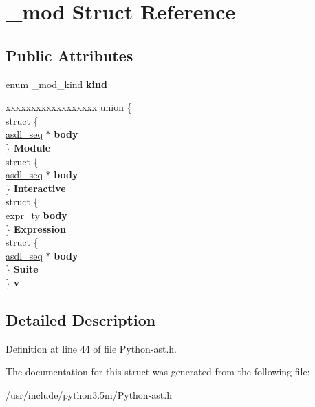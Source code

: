 \hypertarget{struct__mod}{}\section{\+\_\+mod Struct Reference}
\label{struct__mod}
\subsection*{Public Attributes}
\begin{DoxyCompactItemize}
\item 
enum \+\_\+mod\+\_\+kind {\bfseries kind}\hypertarget{struct__mod_aa3c9c2b9eed3828cf2bcf8400859dcc0}{}\label{struct__mod_aa3c9c2b9eed3828cf2bcf8400859dcc0}

\item 
\begin{tabbing}
xx\=xx\=xx\=xx\=xx\=xx\=xx\=xx\=xx\=\kill
union \{\\
\>struct \{\\
\>\>\hyperlink{structasdl__seq}{asdl\_seq} $\ast$ {\bfseries body}\\
\>\} {\bfseries Module}\\
\>struct \{\\
\>\>\hyperlink{structasdl__seq}{asdl\_seq} $\ast$ {\bfseries body}\\
\>\} {\bfseries Interactive}\\
\>struct \{\\
\>\>\hyperlink{struct__expr}{expr\_ty} {\bfseries body}\\
\>\} {\bfseries Expression}\\
\>struct \{\\
\>\>\hyperlink{structasdl__seq}{asdl\_seq} $\ast$ {\bfseries body}\\
\>\} {\bfseries Suite}\\
\} {\bfseries v}\hypertarget{struct__mod_a427c8aef014fa7ba480cb031d5313693}{}\label{struct__mod_a427c8aef014fa7ba480cb031d5313693}
\\

\end{tabbing}\end{DoxyCompactItemize}


\subsection{Detailed Description}


Definition at line 44 of file Python-\/ast.\+h.



The documentation for this struct was generated from the following file\+:\begin{DoxyCompactItemize}
\item 
/usr/include/python3.\+5m/Python-\/ast.\+h\end{DoxyCompactItemize}
